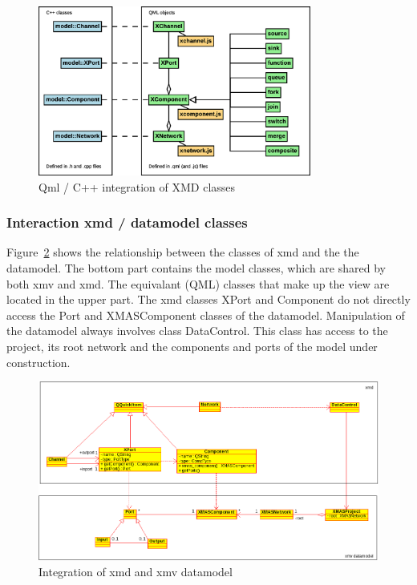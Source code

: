 \begin{figure}
    \centering
    \includegraphics[width=0.8\textwidth]{qml-cpp-classes}
    \caption{Qml / C++ integration of XMD classes}
    \label{fig:qml-cpp-classes}
\end{figure}


\subsubsection{Interaction xmd / datamodel classes}

Figure~\ref{fig:xmd-xmv-integration} shows the relationship between the classes of
xmd and the the datamodel. The bottom part contains the model classes, which are
shared by both xmv and xmd. The equivalant (QML) classes that make up the view are
located in the upper part. The xmd classes XPort and Component do not directly
access the Port and XMASComponent classes of the datamodel. Manipulation of the
datamodel always involves class DataControl. This class has access to the project,
its root network and the components and ports of the model under construction.

\begin{figure}[ht]
    \includegraphics[width=\textwidth]{xmd-xmv-integration}
    \caption{Integration of xmd and xmv datamodel}
    \label{fig:xmd-xmv-integration}
\end{figure}


